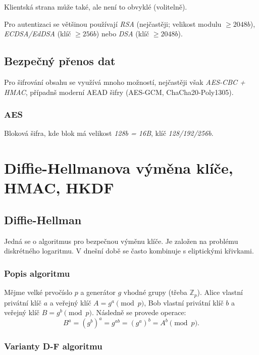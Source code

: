 \documentclass[10pt,a4paper]{article}
\newcommand{\Z}{{\mathbb{Z}}}       %
\begin{document}
Klientská strana může také, ale není to obvyklé (volitelně).

Pro autentizaci se většinou používají \textit{RSA} (nejčastěji; velikost modulu $\geq 2048b$), \textit{ECDSA/EdDSA} (klíč $ \geq 256b $) nebo \textit{DSA} (klíč $ \geq 2048b $).


\subsection{Bezpečný přenos dat}

Pro šifrování obsahu se využívá mnoho možností, nejčastěji však \textit{AES-CBC + HMAC}, případnš moderní AEAD šifry (AES-GCM, ChaCha20-Poly1305).

\subsubsection*{AES}

Bloková šifra, kde blok má velikost \textit{128b = 16B}, klíč \textit{128/192/256b}.


\section{Diffie-Hellmanova výměna klíče, HMAC, HKDF}

\subsection{Diffie-Hellman}

Jedná se o algoritmus pro bezpečnou výměnu klíče. 
Je založen na problému diskrétného logaritmu. 
V dnešní době se často kombinuje s eliptickými křivkami.

\subsubsection*{Popis algoritmu}

Mějme velké prvočíslo $p$ a generátor $g$ vhodné grupy (třeba $\Z_p$).
Alice vlastní privátní klíč $a$ a veřejný klíč $A = g^a \pmod p$,
Bob vlastní privátní klíč $b$ a veřejný klíč $B = g^b \pmod p$.
Následně se provede operace: $$B^a = (g^b)^a = g^{ab} = (g^a)^b = A^b \pmod p.$$

\subsubsection*{Varianty D-F algoritmu}
\end{document}
